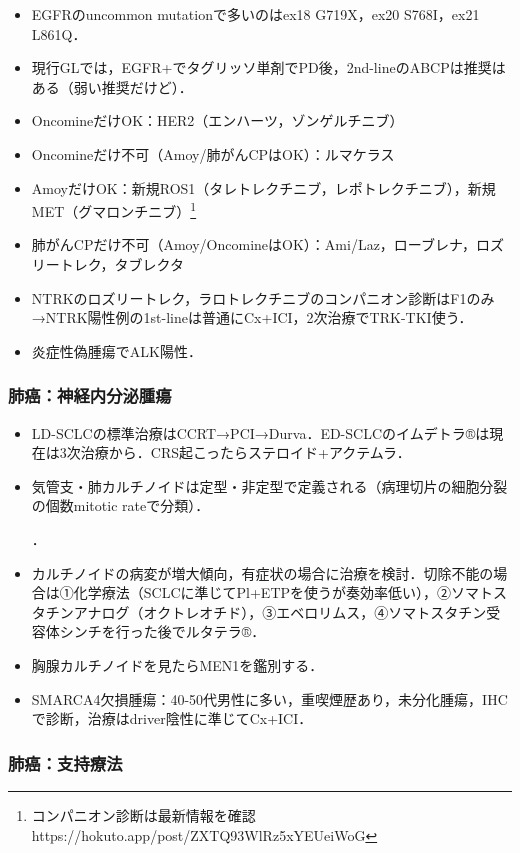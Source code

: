 \begin{itemize}
\item EGFRのuncommon mutationで多いのはex18 G719X，ex20 S768I，ex21 L861Q．
\item 現行GLでは，EGFR+でタグリッソ単剤でPD後，2nd-lineのABCPは推奨はある（弱い推奨だけど）．
\item OncomineだけOK：HER2（エンハーツ，ゾンゲルチニブ）
\item Oncomineだけ不可（Amoy/肺がんCPはOK）：ルマケラス
\item AmoyだけOK：新規ROS1（タレトレクチニブ，レポトレクチニブ），新規MET（グマロンチニブ）\footnote{コンパニオン診断は最新情報を確認 https://hokuto.app/post/ZXTQ93WlRz5xYEUeiWoG}
\item 肺がんCPだけ不可（Amoy/OncomineはOK）：Ami/Laz，ローブレナ，ロズリートレク，タブレクタ
\item NTRKのロズリートレク，ラロトレクチニブのコンパニオン診断はF1のみ→NTRK陽性例の1st-lineは普通にCx+ICI，2次治療でTRK-TKI使う．
\item 炎症性偽腫瘍でALK陽性．
\end{itemize}


\subsubsection{肺癌：神経内分泌腫瘍}

\begin{itemize}
\item LD-SCLCの標準治療はCCRT→PCI→Durva．ED-SCLCのイムデトラ®は現在は3次治療から．CRS起こったらステロイド+アクテムラ．
\item 気管支・肺カルチノイドは定型・非定型で定義される（病理切片の細胞分裂の個数mitotic rateで分類）．

．

\item カルチノイドの病変が増大傾向，有症状の場合に治療を検討．切除不能の場合は①化学療法（SCLCに準じてPl+ETPを使うが奏効率低い），②ソマトスタチンアナログ（オクトレオチド），③エベロリムス，④ソマトスタチン受容体シンチを行った後でルタテラ®．
\item 胸腺カルチノイドを見たらMEN1を鑑別する．
\item SMARCA4欠損腫瘍：40-50代男性に多い，重喫煙歴あり，未分化腫瘍，IHCで診断，治療はdriver陰性に準じてCx+ICI．
\end{itemize}


\subsubsection{肺癌：支持療法}

